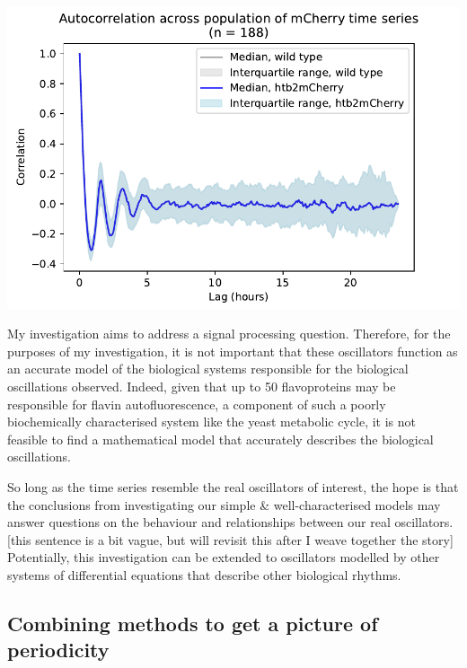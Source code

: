 \begin{enumerate}
\begin{enumerate}
\begin{center}
\includegraphics[width=.9\linewidth]{htb2mCherry_26643_plots_mCh_06.png}
\end{center}
\end{enumerate}
\end{enumerate}


My investigation aims to address a signal processing question.  Therefore, for the purposes of my investigation, it is not important that these oscillators function as an accurate model of the biological systems responsible for the biological oscillations observed.  Indeed, given that up to 50 flavoproteins may be responsible for flavin autofluorescence, a component of such a poorly biochemically characterised system like the yeast metabolic cycle, it is not feasible to find a mathematical model that accurately describes the biological oscillations.

So long as the time series resemble the real oscillators of interest, the hope is that the conclusions from investigating our simple \& well-characterised models may answer questions on the behaviour and relationships between our real oscillators. [this sentence is a bit vague, but will revisit this after I weave together the story]  Potentially, this investigation can be extended to oscillators modelled by other systems of differential equations that describe other biological rhythms.


\subsection{Combining methods to get a picture of periodicity}
\label{subsec:analysis-characterisation-combined}

